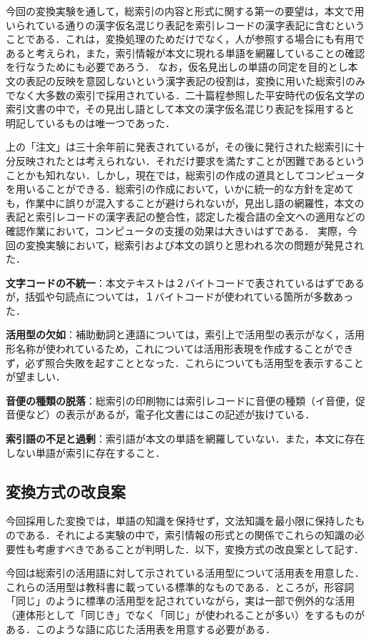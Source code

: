 今回の変換実験を通して，総索引の内容と形式に関する第一の要望は，本文で用いられている通りの漢字仮名混じり表記を索引レコードの漢字表記に含むということである．これは，変換処理のためだけでなく，人が参照する場合にも有用であると考えられ，また，索引情報が本文に現れる単語を網羅していることの確認を行なうためにも必要であろう．
なお，仮名見出しの単語の同定を目的とし本文の表記の反映を意図しないという漢字表記の役割は，変換に用いた総索引のみでなく大多数の索引で採用されている．二十篇程参照した平安時代の仮名文学の索引文書の中で，その見出し語として本文の漢字仮名混じり表記を採用すると
明記しているものは唯一つであった\cite{Yanai1999}．

上の「注文」は三十余年前に発表されているが，その後に発行された総索引に十分反映されたとは考えられない．それだけ要求を満たすことが困難であるということかも知れない．しかし，現在では，総索引の作成の道具としてコンピュータを用いることができる．総索引の作成において，いかに統一的な方針を定めても，作業中に誤りが混入することが避けられないが，見出し語の網羅性，本文の表記と索引レコードの漢字表記の整合性，認定した複合語の全文への適用などの確認作業において，コンピュータの支援の効果は大きいはずである．
実際，今回の変換実験において，総索引および本文の誤りと思われる次の問題が発見された．

\noindent
{\bf 文字コードの不統一}：本文テキストは２バイトコードで表されているはずであるが，括弧や句読点については，１バイトコードが使われている箇所が多数あった．

\noindent
{\bf 活用型の欠如}：補助動詞と連語については，索引上で活用型の表示がなく，活用形名称が使われているため，これについては活用形表現を作成することができず，必ず照合失敗を起すこととなった．これらについても活用型を表示することが望ましい．

\noindent
{\bf 音便の種類の脱落}：総索引の印刷物には索引レコードに音便の種類（イ音便，促音便など）の表示があるが，電子化文書にはこの記述が抜けている．

\noindent
{\bf 索引語の不足と過剰}：索引語が本文の単語を網羅していない．また，本文に存在しない単語が索引に存在すること．


\subsection{変換方式の改良案}
\label{sec:newmethod}
今回採用した変換では，単語の知識を保持せず，文法知識を最小限に保持したものである．それによる実験の中で，索引情報の形式との関係でこれらの知識の必要性も考慮すべきであることが判明した．以下，変換方式の改良案として記す．

今回は総索引の活用語に対して示されている活用型について活用表を用意した．これらの活用型は教科書に載っている標準的なものである．ところが，形容詞「同じ」のように標準の活用型を記されていながら，実は一部で例外的な活用（連体形として「同じき」でなく「同じ」が使われることが多い）をするものがある．このような語に応じた活用表を用意する必要がある．


